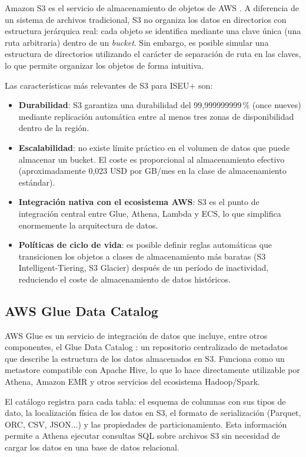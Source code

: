 Amazon S3 es el servicio de almacenamiento de objetos de AWS \parencite{AWS2023S3}. A diferencia de un sistema de archivos tradicional, S3 no organiza los datos en directorios con estructura jerárquica real: cada objeto se identifica mediante una clave única (una ruta arbitraria) dentro de un \textit{bucket}. Sin embargo, es posible simular una estructura de directorios utilizando el carácter de separación de ruta en las claves, lo que permite organizar los objetos de forma intuitiva.

Las características más relevantes de S3 para ISEU+ son:

\begin{itemize}
  \item \textbf{Durabilidad}: S3 garantiza una durabilidad del 99{,}999999999\,\% (once nueves) mediante replicación automática entre al menos tres zonas de disponibilidad dentro de la región.
  \item \textbf{Escalabilidad}: no existe límite práctico en el volumen de datos que puede almacenar un bucket. El coste es proporcional al almacenamiento efectivo (aproximadamente 0{,}023 USD por GB/mes en la clase de almacenamiento estándar).
  \item \textbf{Integración nativa con el ecosistema AWS}: S3 es el punto de integración central entre Glue, Athena, Lambda y ECS, lo que simplifica enormemente la arquitectura de datos.
  \item \textbf{Políticas de ciclo de vida}: es posible definir reglas automáticas que transicionen los objetos a clases de almacenamiento más baratas (S3 Intelligent-Tiering, S3 Glacier) después de un período de inactividad, reduciendo el coste de almacenamiento de datos históricos.
\end{itemize}

\subsection{AWS Glue Data Catalog}

AWS Glue es un servicio de integración de datos que incluye, entre otros componentes, el Glue Data Catalog \parencite{AWS2023Glue}: un repositorio centralizado de metadatos que describe la estructura de los datos almacenados en S3. Funciona como un metastore compatible con Apache Hive, lo que lo hace directamente utilizable por Athena, Amazon EMR y otros servicios del ecosistema Hadoop/Spark.

El catálogo registra para cada tabla: el esquema de columnas con sus tipos de dato, la localización física de los datos en S3, el formato de serialización (Parquet, ORC, CSV, JSON...) y las propiedades de particionamiento. Esta información permite a Athena ejecutar consultas SQL sobre archivos S3 sin necesidad de cargar los datos en una base de datos relacional.

